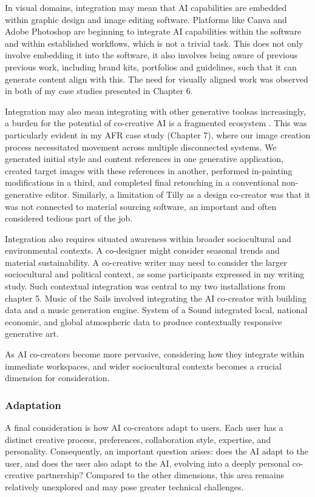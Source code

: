 In visual domains, integration may mean that AI capabilities are embedded within graphic design and image editing software. Platforms like Canva and Adobe Photoshop are beginning to integrate AI capabilities within the software and within established workflows, which is not a trivial task. This does not only involve embedding it into the software, it also involves being aware of previous previous work, including brand kits, portfolios and guidelines, such that it can generate content align with this. The need for visually aligned work was observed in both of my case studies presented in Chapter 6.

Integration may also mean integrating with other generative toolsas increasingly, a burden for the potential of co-creative AI is a fragmented ecosystem \cite{Palani2024-on}. This was particularly evident in my AFR case study (Chapter 7), where our image creation process necessitated movement across multiple disconnected systems. We generated initial style and content references in one generative application, created target images with these references in another, performed in-painting modifications in a third, and completed final retouching in a conventional non-generative editor. Similarly, a limitation of Tilly as a design co-creator was that it was not connected to material sourcing software, an important and often considered tedious part of the job. 

Integration also requires situated awareness within broader sociocultural and environmental contexts. A co-designer might consider seasonal trends and material sustainability. A co-creative writer may need to consider the larger sociocultural and political context, as some participants expressed in my writing study. Such contextual integration was central to my two installations from chapter 5. Music of the Sails involved integrating the AI co-creator with building data and a music generation engine. System of a Sound integrated local, national economic, and global atmospheric data to produce contextually responsive generative art. 

As AI co-creators become more pervasive, considering how they integrate within immediate workspaces, and wider sociocultural contexts becomes a crucial dimension for consideration. 


\subsubsection{Adaptation}

A final consideration is how AI co-creators adapt to users. Each user has a distinct creative process, preferences, collaboration style, expertise, and personality. Consequently, an important question arises: does the AI adapt to the user, and does the user also adapt to the AI, evolving into a deeply personal co-creative partnership? Compared to the other dimensions, this area remains relatively unexplored and may pose greater technical challenges.

